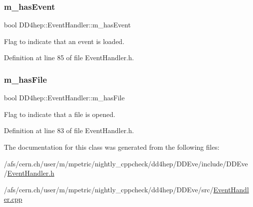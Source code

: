 \subsubsection{\texorpdfstring{m\+\_\+has\+Event}{m\_hasEvent}}
{\footnotesize\ttfamily bool D\+D4hep\+::\+Event\+Handler\+::m\+\_\+has\+Event\hspace{0.3cm}{\ttfamily [protected]}}



Flag to indicate that an event is loaded. 



Definition at line 85 of file Event\+Handler.\+h.

\hypertarget{class_d_d4hep_1_1_event_handler_acfb701f8f671fe75df92d46d846613d5}{}\label{class_d_d4hep_1_1_event_handler_acfb701f8f671fe75df92d46d846613d5} 
\subsubsection{\texorpdfstring{m\+\_\+has\+File}{m\_hasFile}}
{\footnotesize\ttfamily bool D\+D4hep\+::\+Event\+Handler\+::m\+\_\+has\+File\hspace{0.3cm}{\ttfamily [protected]}}



Flag to indicate that a file is opened. 



Definition at line 83 of file Event\+Handler.\+h.



The documentation for this class was generated from the following files\+:\begin{DoxyCompactItemize}
\item 
/afs/cern.\+ch/user/m/mpetric/nightly\+\_\+cppcheck/dd4hep/\+D\+D\+Eve/include/\+D\+D\+Eve/\hyperlink{_event_handler_8h}{Event\+Handler.\+h}\item 
/afs/cern.\+ch/user/m/mpetric/nightly\+\_\+cppcheck/dd4hep/\+D\+D\+Eve/src/\hyperlink{_event_handler_8cpp}{Event\+Handler.\+cpp}\end{DoxyCompactItemize}
